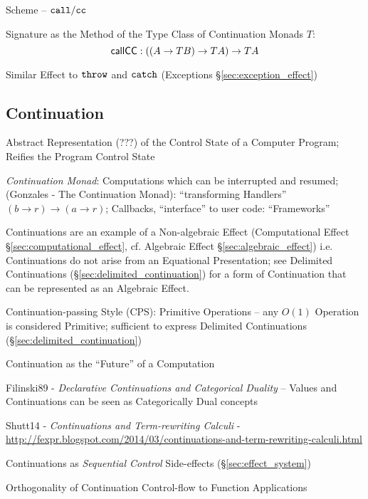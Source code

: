 Scheme -- $\mathtt{call/cc}$

Signature as the Method of the Type Class of Continuation Monads $T$:
\[
  \mathsf{callCC} : ((A \rightarrow T B) \rightarrow T A) \rightarrow T A
\]

\fist Similar Effect to $\mathtt{throw}$ and $\mathtt{catch}$ (Exceptions
\S\ref{sec:exception_effect})



\subsection{Continuation}\label{sec:continuation}

Abstract Representation (???) of the Control State of a Computer
Program; Reifies the Program Control State

\emph{Continuation Monad}: Computations which can be interrupted and
resumed; (Gonzales - The Continuation Monad): ``transforming
Handlers'' $(b \rightarrow r) \rightarrow (a \rightarrow r)$;
Callbacks, ``interface'' to user code: ``Frameworks''

Continuations are an example of a Non-algebraic Effect (Computational
Effect \S\ref{sec:computational_effect}, cf. Algebraic Effect
\S\ref{sec:algebraic_effect}) i.e. Continuations do not arise from an
Equational Presentation; see Delimited Continuations
(\S\ref{sec:delimited_continuation}) for a form of Continuation that
can be represented as an Algebraic Effect.

Continuation-passing Style (CPS): Primitive Operations -- any $O(1)$
Operation is considered Primitive; sufficient to express Delimited
Continuations (\S\ref{sec:delimited_continuation})


Continuation as the ``Future'' of a Computation

Filinski89 - \emph{Declarative Continuations and Categorical Duality} --
Values and Continuations can be seen as Categorically Dual concepts

Shutt14 - \emph{Continuations and Term-rewriting Calculi} -
\url{http://fexpr.blogspot.com/2014/03/continuations-and-term-rewriting-calculi.html}

Continuations as \emph{Sequential Control} Side-effects
(\S\ref{sec:effect_system})

Orthogonality of Continuation Control-flow to Function Applications


